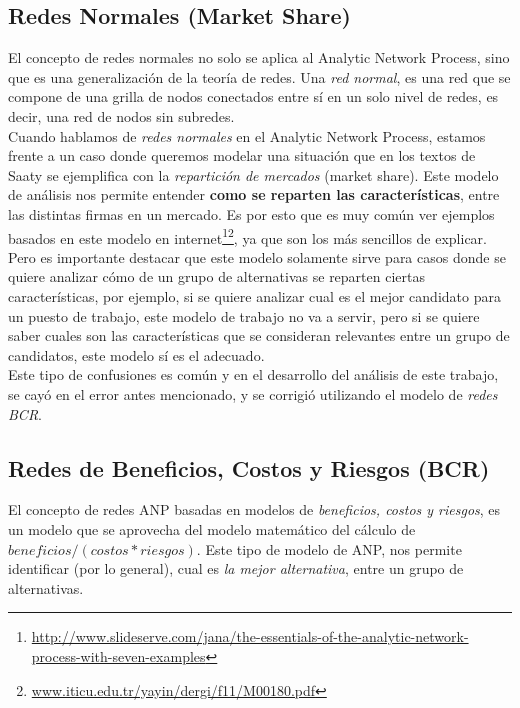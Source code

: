 \documentclass[12pt,twocolumn]{article}
\begin{document}
\subsection{Redes Normales (Market Share)}
El concepto de redes normales no solo se aplica al Analytic Network Process, sino que es una generalización de la teoría de redes. Una \textit{red normal}, es una red que se compone de una grilla de nodos conectados entre sí en un solo nivel de redes, es decir, una red de nodos sin subredes.\\

Cuando hablamos de \textit{redes normales} en el Analytic Network Process, estamos frente a un caso donde queremos modelar una situación que en los textos de Saaty se ejemplifica con la \textit{repartición de mercados} (market share). Este modelo de análisis nos permite entender \textbf{como se reparten las características}, entre las distintas firmas en un mercado. Es por esto que es muy común ver ejemplos basados en este modelo en internet\footnote{\url{http://www.slideserve.com/jana/the-essentials-of-the-analytic-network-process-with-seven-examples}}\footnote{\url{www.iticu.edu.tr/yayin/dergi/f11/M00180.pdf}}, ya que son los más sencillos de explicar. Pero es importante destacar que este modelo solamente sirve para casos donde se quiere analizar cómo de un grupo de alternativas se reparten ciertas características, por ejemplo, si se quiere analizar cual es el mejor candidato para un puesto de trabajo, este modelo de trabajo no va a servir, pero si se quiere saber cuales son las características que se consideran relevantes entre un grupo de candidatos, este modelo sí es el adecuado.\\
Este tipo de confusiones es común y en el desarrollo del análisis de este trabajo, se cayó en el error antes mencionado, y se corrigió utilizando el modelo de \textit{redes BCR}.

\subsection{Redes de  Beneficios, Costos y Riesgos (BCR)}
El concepto de redes ANP basadas en modelos de \textit{beneficios, costos y riesgos}, es un modelo que se aprovecha del modelo matemático del cálculo de $beneficios / (costos * riesgos)$. Este tipo de modelo de ANP, nos permite identificar (por lo general), cual es \textit{la mejor alternativa}, entre un grupo de alternativas.\\
\end{document}
